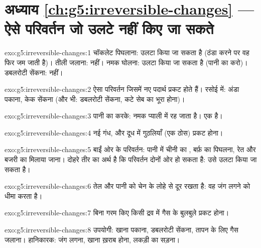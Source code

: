 \section*{अध्याय \ref{ch:g5:irreversible-changes} --- ऐसे परिवर्तन जो उलटे नहीं किए जा सकते}

\begin{solution}{exo:g5:irreversible-changes:1}
चॉकलेट पिघलाना: उलटा किया जा सकता है (ठंडा करने पर वह फिर जम जाती है)।
तीली जलाना: नहीं। नमक घोलना: उलटा किया जा सकता है (पानी का  करो)।
डबलरोटी सेंकना: नहीं।
\end{solution}

\begin{solution}{exo:g5:irreversible-changes:2}
ऐसा परिवर्तन जिसमें नए पदार्थ प्रकट होते हैं। रसोई में: अंडा पकाना,
केक सेंकना (और भी: डबलरोटी सेंकना, कटे सेब का भूरा होना)।
\end{solution}

\begin{solution}{exo:g5:irreversible-changes:3}
पानी का  करके: नमक प्याली में रह जाता है।  एक
 है।
\end{solution}

\begin{solution}{exo:g5:irreversible-changes:4}
नई गंध, और दूध में गुठलियाँ (एक ठोस) प्रकट होना।
\end{solution}

\begin{solution}{exo:g5:irreversible-changes:5}
बाईं ओर के परिवर्तन: पानी में चीनी का , बर्फ़ का पिघलना, रेत
और बजरी का मिलाया जाना। दोहरे तीर का अर्थ है कि परिवर्तन दोनों ओर
हो सकता है: उसे उलटा किया जा सकता है।
\end{solution}

\begin{solution}{exo:g5:irreversible-changes:6}
तेल  और पानी को चेन के लोहे से दूर रखता है: वह जंग लगने को धीमा
करता है।
\end{solution}

\begin{solution}{exo:g5:irreversible-changes:7}
बिना गरम किए किसी द्रव में गैस के बुलबुले प्रकट होना।
\end{solution}

\begin{solution}{exo:g5:irreversible-changes:8}
उपयोगी: खाना पकाना, डबलरोटी सेंकना, तापन के लिए गैस जलाना। हानिकारक:
जंग लगना, खाना ख़राब होना, लकड़ी का सड़ना।
\end{solution}

